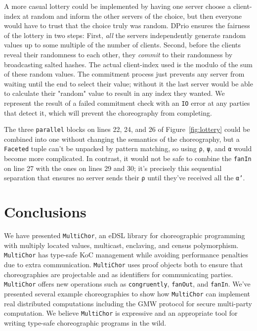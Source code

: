 \documentclass[sigplan,screen,review,anonymous]{acmart}
\newcommand{\inlinecode}[2][haskell]{\texttt{#2}}
\newcommand{\MultiChor}{\texttt{Multi\-Chor}\xspace}
\begin{document}
A more casual lottery could be implemented by having one server choose a client-index at random
and inform the other servers of the choice,
but then everyone would have to trust that the choice truly was random.
DPrio ensures the fairness of the lottery in two steps:
First, \emph{all} the servers independently generate random values up to some multiple
of the number of clients.
Second, before the clients reveal their randomness to each other,
they \emph{commit} to their randomness by broadcasting salted hashes.
The actual client-index used is the modulo of the sum of these random values.
The commitment process just prevents any server from waiting until the end to select their value;
without it the last server would be able to calculate their "random" value to result in
any index they wanted.
We represent the result of a failed commitment check with an \inlinecode{IO} error
at any parties that detect it, which will prevent the choreography from completing.

The three \inlinecode{parallel} blocks on lines 22, 24, and 26 of Figure~\ref{fig:lottery}
could be combined into one without changing the semantics of the choreography,
but a \inlinecode{Faceted} tuple can't be unpacked by pattern matching,
so using \inlinecode{ρ}, \inlinecode{ψ}, and \inlinecode{α}
would become more complicated.
In contrast, it would not be safe to combine the \inlinecode{fanIn} on line 27
with the ones on lines 29 and 30;
it's precisely this sequential separation that ensures no server sends their \inlinecode{ρ}
until they've received all the \inlinecode{α'}.



\section{Conclusions}\label{sec:conclusion}

We have presented \MultiChor, an eDSL library for choreographic programming with
multiply located values, multicast, enclaving, and census polymorphism.
\MultiChor has type-safe KoC management
while avoiding performance penalties due to extra communication.
\MultiChor uses proof objects
both to ensure that choreographies are projectable and as identifiers
for communicating parties.
\MultiChor offers new operations such as \inlinecode{congruently},
\inlinecode{fanOut}, and \inlinecode{fanIn}.
We've presented several example choreographies to show how \MultiChor can implement
real distributed computations including the GMW protocol for secure multi-party computation.
We believe \MultiChor is expressive and an appropriate tool for writing
type-safe choreographic programs in the wild.
\end{document}
